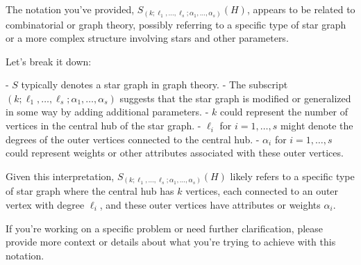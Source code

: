 The notation you've provided, \( S_{(k;\ell_1,\ldots,\ell_s;\alpha_1,\ldots,\alpha_s)}(H) \), appears to be related to combinatorial or graph theory, possibly referring to a specific type of star graph or a more complex structure involving stars and other parameters.

Let's break it down:

- \( S \) typically denotes a star graph in graph theory.
- The subscript \( (k;\ell_1,\ldots,\ell_s;\alpha_1,\ldots,\alpha_s) \) suggests that the star graph is modified or generalized in some way by adding additional parameters.
  - \( k \) could represent the number of vertices in the central hub of the star graph.
  - \( \ell_i \) for \( i = 1, \ldots, s \) might denote the degrees of the outer vertices connected to the central hub.
  - \( \alpha_i \) for \( i = 1, \ldots, s \) could represent weights or other attributes associated with these outer vertices.

Given this interpretation, \( S_{(k;\ell_1,\ldots,\ell_s;\alpha_1,\ldots,\alpha_s)}(H) \) likely refers to a specific type of star graph where the central hub has \( k \) vertices, each connected to an outer vertex with degree \( \ell_i \), and these outer vertices have attributes or weights \( \alpha_i \).

If you're working on a specific problem or need further clarification, please provide more context or details about what you're trying to achieve with this notation.